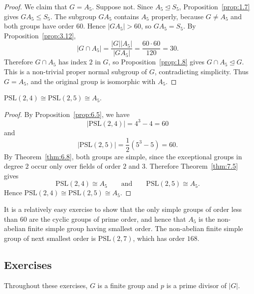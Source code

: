 \documentclass[../Odyssey_Project.tex]{subfiles}
\begin{document}
\begin{proof}
We claim that $G=A_5$. Suppose not. Since $A_5\trianglelefteq S_5$, Proposition~\ref{prop:1.7} gives $GA_5\leq S_5$. The subgroup $GA_5$ contains $A_5$ properly, because $G\neq A_5$ and both groups have order $60$. Hence $|GA_5|>60$, so $GA_5=S_5$. By Proposition~\ref{prop:3.12},
\[
    |G\cap A_5|=\frac{|G||A_5|}{|GA_5|}
    =\frac{60\cdot 60}{120}
    =30.
\]
Therefore $G\cap A_5$ has index $2$ in $G$, so Proposition~\ref{prop:1.8} gives $G\cap A_5\trianglelefteq G$. This is a non-trivial proper normal subgroup of $G$, contradicting simplicity. Thus $G=A_5$, and the original group is isomorphic with $A_5$.
\end{proof}

\begin{corollary}
\label{cor:7.6}
$\mathrm{PSL}(2, 4) \cong \mathrm{PSL}(2, 5) \cong A_5$.
\end{corollary}
\begin{proof}
By Proposition~\ref{prop:6.5}, we have
\[
    |\mathrm{PSL}(2,4)|=4^3-4=60
\]
and
\[
    |\mathrm{PSL}(2,5)|=\frac{1}{2}(5^3-5)=60.
\]
By Theorem~\ref{thm:6.8}, both groups are simple, since the exceptional groups in degree $2$ occur only over fields of order $2$ and $3$. Therefore Theorem~\ref{thm:7.5} gives
\[
    \mathrm{PSL}(2,4)\cong A_5
    \qquad\text{and}\qquad
    \mathrm{PSL}(2,5)\cong A_5.
\]
Hence $\mathrm{PSL}(2,4)\cong \mathrm{PSL}(2,5)\cong A_5$.
\end{proof}

\noindent It is a relatively easy exercise to show that the only simple groups of order less than $60$ are the cyclic groups of prime order, and hence that $A_5$ is the non-abelian finite simple group having smallest order. The non-abelian finite simple group of next smallest order is $\mathrm{PSL}(2, 7)$, which has order $168$.

\subsection*{Exercises}

\noindent Throughout these exercises, $G$ is a finite group and $p$ is a prime divisor of $|G|$.
\end{document}
